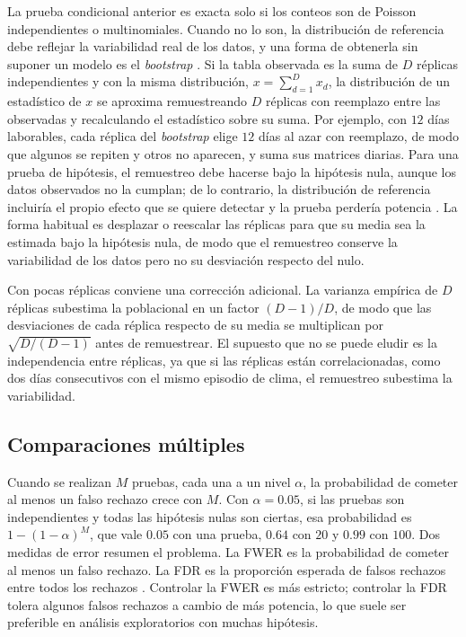 La prueba condicional anterior es exacta solo si los conteos son de Poisson
independientes o multinomiales.
Cuando no lo son, la distribución de referencia debe reflejar la variabilidad
real de los datos, y una forma de obtenerla sin suponer un modelo es el
\emph{bootstrap} \citep{Efron1993}. Si la tabla observada es la suma de $D$
réplicas independientes y con la misma distribución, $x = \sum_{d=1}^{D} x_d$,
la distribución de un estadístico de $x$ se aproxima remuestreando $D$ réplicas
con reemplazo entre las observadas y recalculando el estadístico sobre su suma.
Por ejemplo, con $12$ días laborables, cada réplica del \emph{bootstrap} elige $12$
días al azar con reemplazo, de modo que algunos se repiten y otros no aparecen, y
suma sus matrices diarias. Para una prueba de hipótesis, el remuestreo debe hacerse bajo la hipótesis
nula, aunque los datos observados no la cumplan; de lo contrario, la
distribución de referencia incluiría el propio efecto que se quiere detectar y
la prueba perdería potencia \citep{HallWilson1991}. La forma habitual es
desplazar o reescalar las réplicas para que su media sea la estimada bajo la
hipótesis nula, de modo que el remuestreo conserve la variabilidad de los datos
pero no su desviación respecto del nulo.

Con pocas réplicas conviene una corrección adicional. La varianza empírica de
$D$ réplicas subestima la poblacional en un factor $(D-1)/D$, de modo que las
desviaciones de cada réplica respecto de su media se multiplican por
$\sqrt{D/(D-1)}$ antes de remuestrear. El supuesto que no se puede eludir es la
independencia entre réplicas, ya que si las réplicas están correlacionadas, como dos
días consecutivos con el mismo episodio de clima, el remuestreo subestima la
variabilidad.

\subsection{Comparaciones múltiples}\label{sec:est-multiplicidad}

Cuando se realizan $M$ pruebas, cada una a un nivel $\alpha$, la probabilidad de
cometer al menos un falso rechazo crece con $M$. Con $\alpha = 0.05$, si las
pruebas son independientes y todas las hipótesis nulas son ciertas, esa
probabilidad es $1-(1-\alpha)^M$, que vale $0.05$ con una prueba, $0.64$ con $20$
y $0.99$ con $100$. Dos medidas de error resumen el problema. La \ac{FWER} es la
probabilidad de cometer al menos un falso rechazo. La \ac{FDR} es la proporción
esperada de falsos rechazos entre todos los rechazos \citep{Benjamini1995}.
Controlar la FWER es más estricto; controlar la FDR tolera algunos falsos
rechazos a cambio de más potencia, lo que suele ser preferible en análisis
exploratorios con muchas hipótesis.

